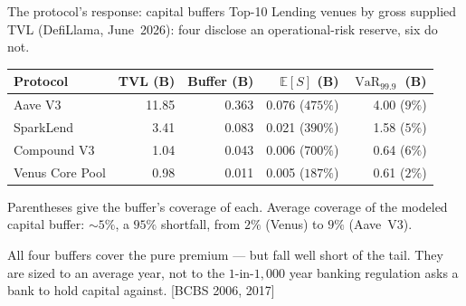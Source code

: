 \documentclass[10pt,xcolor=x11names,aspectratio=169]{beamer}
\newcommand{\VaR}{\operatorname{VaR}}
\newcommand{\E}{\mathbb{E}}
\newcommand{\src}[1]{[#1]}
\begin{document}
\begin{frame}{The protocol's response: capital buffers}
  Top-10 Lending venues by gross supplied TVL (DefiLlama, June~2026):
  four disclose an operational-risk reserve, six do not.
  \vskip 2mm
  \begin{center}
    \small
    \begin{tabular}{l r r r r}
      \toprule
      Protocol & TVL (B) & Buffer (B) & $\E[S]$ (B) & $\VaR_{99.9}$ (B) \\
      \midrule
      Aave V3         & 11.85 & 0.363 & 0.076 ($475\%$) & 4.00 ($9\%$) \\
      SparkLend       &  3.41 & 0.083 & 0.021 ($390\%$) & 1.58 ($5\%$) \\
      Compound V3     &  1.04 & 0.043 & 0.006 ($700\%$) & 0.64 ($6\%$) \\
      Venus Core Pool &  0.98 & 0.011 & 0.005 ($187\%$) & 0.61 ($2\%$) \\
      \bottomrule
    \end{tabular}
  \end{center}
  \vskip 2mm
  Parentheses give the buffer's coverage of each. Average coverage of the
  modeled capital buffer: $\sim 5\%$, a $95\%$ shortfall, from $2\%$
  (Venus) to $9\%$ (Aave~V3).
  \begin{takeaway}
    All four buffers cover the pure premium --- but fall well short of the
    tail. They are sized to an average year, not to the $1$-in-$1{,}000$ year
    banking regulation asks a bank to hold capital against.
    \src{BCBS 2006, 2017}
  \end{takeaway}
\end{frame}
\end{document}
